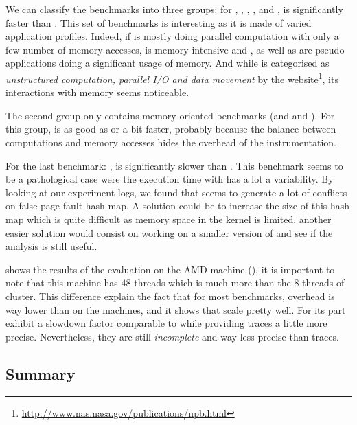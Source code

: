 We can classify the benchmarks into three groups:
for \BT, \CG, \EP, \LU, \SP and \UA, \Moca is
significantly faster than \TABARNAC. This set of benchmarks is interesting as it is made of varied application profiles.
Indeed, if \EP is mostly doing parallel computation with only a few number of
memory accesses, \CG is memory intensive and
\BT, \LU as well as \SP are pseudo applications doing a significant usage of memory.
And while \UA is categorised as \emph{unstructured computation,
parallel I/O and data movement} by the \NPB
website\footnote{\url{http://www.nas.nasa.gov/publications/npb.html}}, its
interactions with memory seems noticeable.

The second group only contains memory oriented benchmarks (\DC and \FT and
\IS). For this group, \Moca is as good as \TABARNAC or a bit faster, probably
because the balance between computations and memory accesses hides the
overhead of the instrumentation.

For the last benchmark: \MG, \Moca is significantly slower than \TABARNAC. This benchmark
seems to be a pathological case were the execution time with \Moca has a lot a
variability. By looking at our experiment logs, we found that \MG seems to
generate a lot of conflicts on \Moca false page fault hash map. A solution
could be to increase the size of this hash map which is quite difficult as
memory space in the kernel is limited, another easier solution would consist on
working on a smaller version of \MG and see if the analysis is still useful.

 shows the results of the evaluation on the AMD machine
(\Idfreeze), it is important to note that this machine has $48$ threads which
is much more than the $8$ threads of \Edel cluster. This difference explain
the fact that for most benchmarks, \Moca overhead is way lower than on the
\Edel machines, and it shows that \Moca scale pretty well.
For its part \MemProf exhibit a slowdown factor comparable to \Mitos while
providing traces a little more precise. Nevertheless, they are still \emph{incomplete} and
way less precise than \Moca traces.


\subsection{Summary}
\label{sec:expe-cncl}

